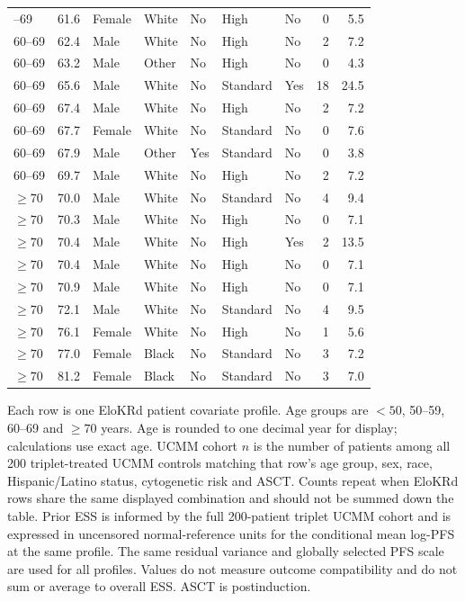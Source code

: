 \begin{longtable}{lrlllllrr}
\addlinespace[3pt]
60--69 & 61.6 & Female & White & No & High & No & 0 & 5.5 \\
60--69 & 62.4 & Male & White & No & High & No & 2 & 7.2 \\
60--69 & 63.2 & Male & Other & No & High & No & 0 & 4.3 \\
60--69 & 65.6 & Male & White & No & Standard & Yes & 18 & 24.5 \\
60--69 & 67.4 & Male & White & No & High & No & 2 & 7.2 \\
60--69 & 67.7 & Female & White & No & Standard & No & 0 & 7.6 \\
60--69 & 67.9 & Male & Other & Yes & Standard & No & 0 & 3.8 \\
60--69 & 69.7 & Male & White & No & High & No & 2 & 7.2 \\
\addlinespace[3pt]
$\geq70$ & 70.0 & Male & White & No & Standard & No & 4 & 9.4 \\
$\geq70$ & 70.3 & Male & White & No & High & No & 0 & 7.1 \\
$\geq70$ & 70.4 & Male & White & No & High & Yes & 2 & 13.5 \\
$\geq70$ & 70.4 & Male & White & No & High & No & 0 & 7.1 \\
$\geq70$ & 70.9 & Male & White & No & High & No & 0 & 7.1 \\
$\geq70$ & 72.1 & Male & White & No & Standard & No & 4 & 9.5 \\
$\geq70$ & 76.1 & Female & White & No & High & No & 1 & 5.6 \\
$\geq70$ & 77.0 & Female & Black & No & Standard & No & 3 & 7.2 \\
$\geq70$ & 81.2 & Female & Black & No & Standard & No & 3 & 7.0 \\
\end{longtable}
\noindent\begin{minipage}{\linewidth}\footnotesize Each row is one EloKRd patient covariate profile. Age groups are $<50$, 50--59, 60--69 and $\geq70$ years. Age is rounded to one decimal year for display; calculations use exact age. UCMM cohort $n$ is the number of patients among all 200 triplet-treated UCMM controls matching that row's age group, sex, race, Hispanic/Latino status, cytogenetic risk and ASCT. Counts repeat when EloKRd rows share the same displayed combination and should not be summed down the table. Prior ESS is informed by the full 200-patient triplet UCMM cohort and is expressed in uncensored normal-reference units for the conditional mean log-PFS at the same profile. The same residual variance and globally selected PFS scale are used for all profiles. Values do not measure outcome compatibility and do not sum or average to overall ESS. ASCT is postinduction.\end{minipage}
\endgroup
